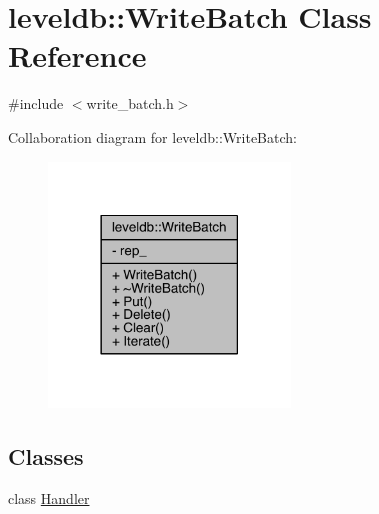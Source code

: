 \hypertarget{classleveldb_1_1_write_batch}{}\section{leveldb\+:\+:Write\+Batch Class Reference}
\label{classleveldb_1_1_write_batch}


{\ttfamily \#include $<$write\+\_\+batch.\+h$>$}



Collaboration diagram for leveldb\+:\+:Write\+Batch\+:\nopagebreak
\begin{figure}[H]
\begin{center}
\leavevmode
\includegraphics[width=182pt]{classleveldb_1_1_write_batch__coll__graph}
\end{center}
\end{figure}
\subsection*{Classes}
\begin{DoxyCompactItemize}
\item 
class \hyperlink{classleveldb_1_1_write_batch_1_1_handler}{Handler}
\end{DoxyCompactItemize}
